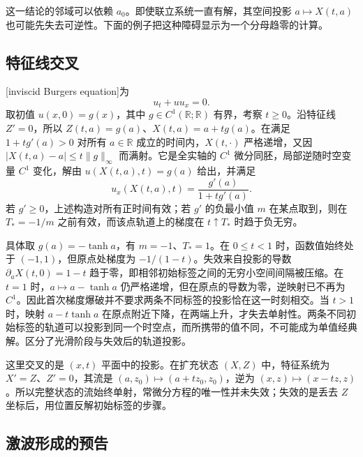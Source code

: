 这一结论的邻域可以依赖 \(a_0\)。即使联立系统一直有解，其空间投影 \(a\mapsto X(t,a)\) 也可能先失去可逆性。下面的例子把这种障碍显示为一个分母趋零的计算。

\subsection{特征线交叉}
\label{b2:subsec:070402}

[inviscid Burgers equation]为
\[
 u_t+u u_x=0.
\]
取初值 \(u(x,0)=g(x)\)，其中 \(g\in C^1(\mathbb R;\mathbb R)\) 有界，考察 \(t\geq0\)。沿特征线 \(Z'=0\)，所以 \(Z(t,a)=g(a)\)、\(X(t,a)=a+tg(a)\)。在满足 \(1+tg'(a)>0\) 对所有 \(a\in\mathbb R\) 成立的时间内，\(X(t,\cdot)\) 严格递增，又因 \(|X(t,a)-a|\leq t\|g\|_\infty\) 而满射。它是全实轴的 \(C^1\) 微分同胚，局部逆随时空变量 \(C^1\) 变化，解由 \(u(X(t,a),t)=g(a)\) 给出，并满足
\begin{equation}\label{b2:eq:07-burgers-gradient}
 u_x(X(t,a),t)=\frac{g'(a)}{1+tg'(a)}.
\end{equation}
若 \(g'\geq0\)，上述构造对所有正时间有效；若 \(g'\) 的负最小值 \(m\) 在某点取到，则在 \(T_*=-1/m\) 之前有效，而该点轨道上的梯度在 \(t\uparrow T_*\) 时趋于负无穷。

\ProseParagraphBreak

具体取 \(g(a)=-\tanh a\)，有 \(m=-1\)、\(T_*=1\)。在 \(0\leq t<1\) 时，函数值始终处于 \((-1,1)\)，但原点处梯度为 \(-1/(1-t)\)。失效来自投影的导数 \(\partial_aX(t,0)=1-t\) 趋于零，即相邻初始标签之间的无穷小空间间隔被压缩。在 \(t=1\) 时，\(a\mapsto a-\tanh a\) 仍严格递增，但在原点的导数为零，逆映射已不再为 \(C^1\)。因此首次梯度爆破并不要求两条不同标签的投影恰在这一时刻相交。当 \(t>1\) 时，映射 \(a-t\tanh a\) 在原点附近下降，在两端上升，才失去单射性。两条不同初始标签的轨道可以投影到同一个时空点，而所携带的值不同，不可能成为单值经典解。区分了光滑阶段与失效后的轨道投影。

\ProseParagraphBreak

这里交叉的是 \((x,t)\) 平面中的投影。在扩充状态 \((X,Z)\) 中，特征系统为 \(X'=Z\)、\(Z'=0\)，其流是 \((a,z_0)\mapsto(a+tz_0,z_0)\)，逆为 \((x,z)\mapsto(x-tz,z)\)。所以完整状态的流始终单射，常微分方程的唯一性并未失效；失效的是丢去 \(Z\) 坐标后，用位置反解初始标签的步骤。


\subsection{激波形成的预告}
\label{b2:subsec:070403}

